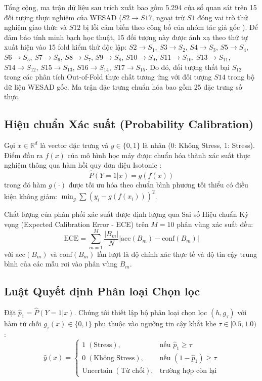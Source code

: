 \documentclass[conference]{IEEEtran}
\begin{document}
Tổng cộng, ma trận dữ liệu sau trích xuất bao gồm 5.294 cửa sổ quan sát trên 15 đối tượng thực nghiệm của WESAD ($S2 \rightarrow S17$, ngoại trừ $S1$ đóng vai trò thử nghiệm giao thức và $S12$ bị lỗi cảm biến theo công bố của nhóm tác giả gốc \cite{schmidt2018wesad}). Để đảm bảo tính minh bạch học thuật, 15 đối tượng này được ánh xạ theo thứ tự xuất hiện vào 15 fold kiểm thử độc lập: $S2 \rightarrow S_1$, $S3 \rightarrow S_2$, $S4 \rightarrow S_3$, $S5 \rightarrow S_4$, $S6 \rightarrow S_5$, $S7 \rightarrow S_6$, $S8 \rightarrow S_7$, $S9 \rightarrow S_8$, $S10 \rightarrow S_9$, $S11 \rightarrow S_{10}$, $S13 \rightarrow S_{11}$, $S14 \rightarrow S_{12}$, $S15 \rightarrow S_{13}$, $S16 \rightarrow S_{14}$, $S17 \rightarrow S_{15}$. Do đó, đối tượng thất bại $S_{12}$ trong các phân tích Out-of-Fold thực chất tương ứng với đối tượng $S14$ trong bộ dữ liệu WESAD gốc. Ma trận đặc trưng chuẩn hóa bao gồm 25 đặc trưng số thực.

\subsection{Hiệu chuẩn Xác suất (Probability Calibration)}
Gọi $x \in \mathbb{R}^d$ là vector đặc trưng và $y \in \{0, 1\}$ là nhãn (0: Không Stress, 1: Stress). Điểm đầu ra $f(x)$ của mô hình học máy được chuẩn hóa thành xác suất thực nghiệm thông qua hàm hồi quy đơn điệu Isotonic \cite{niculescu2005predicting, zadrozny2002transforming}:
\begin{equation}
\hat{P}(Y=1|x) = g(f(x))
\end{equation}
trong đó hàm $g(\cdot)$ được tối ưu hóa theo chuẩn bình phương tối thiểu có điều kiện không giảm: $\min_g \sum (y_i - g(f(x_i)))^2$.

Chất lượng của phân phối xác suất được định lượng qua Sai số Hiệu chuẩn Kỳ vọng (Expected Calibration Error - ECE) \cite{guo2017calibration} trên $M=10$ phân vùng xác suất đều:
\begin{equation}
\text{ECE} = \sum_{m=1}^M \frac{|B_m|}{N} \left| \text{acc}(B_m) - \text{conf}(B_m) \right|
\end{equation}
với $\text{acc}(B_m)$ và $\text{conf}(B_m)$ lần lượt là độ chính xác thực tế và độ tin cậy trung bình của các mẫu rơi vào phân vùng $B_m$.

\subsection{Luật Quyết định Phân loại Chọn lọc}
Đặt $\hat{p}_1 = \hat{P}(Y=1|x)$. Chúng tôi thiết lập bộ phân loại chọn lọc $(h, g_\tau)$ với hàm từ chối $g_\tau(x) \in \{0, 1\}$ phụ thuộc vào ngưỡng tin cậy khắt khe $\tau \in [0.5, 1.0)$ \cite{chow1970optimum, geifman2017selective}:
\begin{equation}
\hat{y}(x) = 
\begin{cases} 
1 \; (\text{Stress}), & \text{nếu } \hat{p}_1 \ge \tau \\
0 \; (\text{Không Stress}), & \text{nếu } (1 - \hat{p}_1) \ge \tau \\
\text{Uncertain} \; (\text{Từ chối}), & \text{trường hợp còn lại}
\end{cases}
\end{equation}
\end{document}

